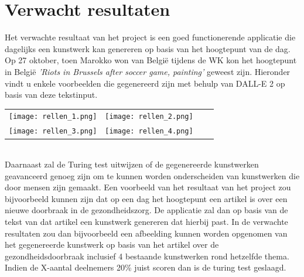 \section{Verwacht resultaten}%
\label{sec:verwachte_resultaten}
\noindent
Het verwachte resultaat van het project is een goed functionerende applicatie die dagelijks een kunstwerk kan genereren op basis van het hoogtepunt van de dag.
\noindent
Op 27 oktober, toen Marokko won van België tijdens de WK kon het hoogtepunt in België \emph{'Riots in Brussels after soccer game, painting'} geweest zijn. Hieronder vindt u enkele voorbeelden die gegenereerd zijn met behulp van DALL-E 2 op basis van deze tekstinput. \\


\noindent
\begin{tabular}{llll}
    \label{fig:examples}
    \texttt{[image: rellen\_1.png]} &
    \texttt{[image: rellen\_2.png]} \\
    \texttt{[image: rellen\_3.png]} &
    \texttt{[image: rellen\_4.png]}
\end{tabular} \\
\noindent
Daarnaast zal de Turing test uitwijzen of de gegenereerde kunstwerken geavanceerd genoeg zijn om te kunnen worden onderscheiden van kunstwerken die door mensen zijn gemaakt.
\noindent
Een voorbeeld van het resultaat van het project zou bijvoorbeeld kunnen zijn dat op een dag het hoogtepunt een artikel is over een nieuwe doorbraak in de gezondheidszorg. De applicatie zal dan op basis van de tekst van dat artikel een kunstwerk genereren dat hierbij past. In de verwachte resultaten zou dan bijvoorbeeld een afbeelding kunnen worden opgenomen van het gegenereerde kunstwerk op basis van het artikel over de gezondheidsdoorbraak inclusief 4 bestaande kunstwerken rond hetzelfde thema. Indien de X-aantal deelnemers  20\% juist scoren dan is de turing test geslaagd.

